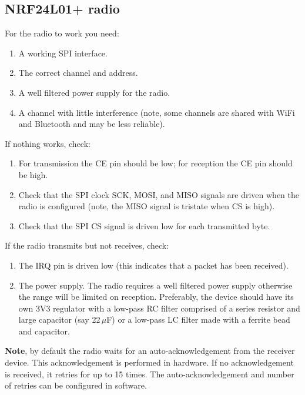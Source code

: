 

\subsection{NRF24L01+ radio}
\label{nrf24l01-radio}

For the radio to work you need:

\begin{enumerate}
\item
  A working SPI interface.
\item
  The correct channel and address.
\item
  A well filtered power supply for the radio.
\item
  A channel with little interference (note, some channels are shared
  with WiFi and Bluetooth and may be less reliable).
\end{enumerate}

If nothing works, check:

\begin{enumerate}
\item
  For transmission the CE pin should be low; for reception the CE pin
  should be high.
\item
  Check that the SPI clock SCK, MOSI, and MISO signals are driven when
  the radio is configured (note, the MISO signal is tristate when CS is
  high).
\item
  Check that the SPI CS signal is driven low for each transmitted byte.
\end{enumerate}

If the radio transmits but not receives, check:

\begin{enumerate}
\item
  The IRQ pin is driven low (this indicates that a packet has been
  received).
\item
  The power supply. The radio requires a well filtered power supply
  otherwise the range will be limited on reception. Preferably, the
  device should have its own 3V3 regulator with a low-pass RC filter
  comprised of a series resistor and large capacitor (say 22\,$\mu$F) or a
  low-pass LC filter made with a ferrite bead and capacitor.
\end{enumerate}

\textbf{Note}, by default the radio waits for an auto-acknowledgement
from the receiver device. This acknowledgement is performed in hardware.
If no acknowledgement is received, it retries for up to 15 times. The
auto-acknowledgement and number of retries can be configured in
software.

